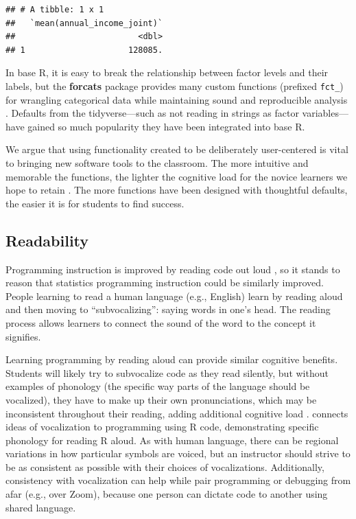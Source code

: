 \documentclass[12pt]{article}
\begin{document}
\begin{verbatim}
## # A tibble: 1 x 1
##   `mean(annual_income_joint)`
##                         <dbl>
## 1                     128085.
\end{verbatim}


\label{tidy-na} \linespread{2} \vspace{3mm}\setlength{\parindent}{15pt}

In base R, it is easy to break the relationship between factor levels
and their labels, but the \textbf{forcats} package \citep{R-forcats}
provides many custom functions (prefixed \texttt{fct\_}) for wrangling
categorical data while maintaining sound and reproducible analysis
\citep{mcnamara2018wrangling}. Defaults from the tidyverse---such as not
reading in strings as factor variables---have gained so much popularity
they have been integrated into base R.

We argue that using functionality created to be deliberately
user-centered is vital to bringing new software tools to the classroom.
The more intuitive and memorable the functions, the lighter the
cognitive load for the novice learners we hope to retain
\citep{burr2021, fergusson2021, mcnamaraetal2021a, lovettgreenhouse2000}.
The more functions have been designed with thoughtful defaults, the
easier it is for students to find success.

\hypertarget{sec:reading}{%
\subsection{Readability}\label{sec:reading}}

Programming instruction is improved by reading code out loud
\citep{SwiHer2019}, so it stands to reason that statistics programming
instruction could be similarly improved. People learning to read a human
language (e.g., English) learn by reading aloud and then moving to
``subvocalizing'': saying words in one's head. The reading process
allows learners to connect the sound of the word to the concept it
signifies.

Learning programming by reading aloud can provide similar cognitive
benefits. Students will likely try to subvocalize code as they read
silently, but without examples of phonology (the specific way parts of
the language should be vocalized), they have to make up their own
pronunciations, which may be inconsistent throughout their reading,
adding additional cognitive load \citep{HerSwi2018}. \citet{McN2020}
connects ideas of vocalization to programming using R code,
demonstrating specific phonology for reading R aloud. As with human
language, there can be regional variations in how particular symbols are
voiced, but an instructor should strive to be as consistent as possible
with their choices of vocalizations. Additionally, consistency with
vocalization can help while pair programming or debugging from afar
(e.g., over Zoom), because one person can dictate code to another using
shared language.
\end{document}
